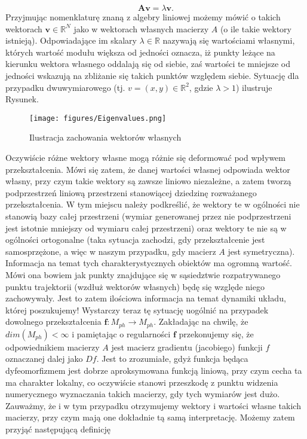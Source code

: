 \documentclass[12pt]{article}
\begin{document}
\begin{equation}
	\textbf{A}\textbf{v} = \lambda \textbf{v}.
\end{equation}
Przyjmując nomenklaturę znaną z algebry liniowej możemy mówić o takich wektorach $ \textbf{v} \in \mathbb{R}^{N} $ jako w wektorach własnych macierzy $ A $ (o ile takie wektory istnieją). Odpowiadające im skalary $ \lambda \in \mathbb{R} $ nazywają się wartościami własnymi, których wartość modułu większa od jedności oznacza, iż punkty leżące na kierunku wektora własnego oddalają się od siebie, zaś wartości te mniejsze od jedności wskazują na zbliżanie się takich punktów względem siebie. Sytuację dla przypadku dwuwymiarowego (tj. $ v = (x,y) \in \mathbb{R}^2 $, gdzie $ \lambda > 1 $) ilustruje Rysunek.
\begin{figure}[H]
	\texttt{[image: figures/Eigenvalues.png]} 
	\centering
	\caption{Ilustracja zachowania wektorów własnych}
\end{figure}
Oczywiście różne wektory własne mogą różnie się deformować pod wpływem przekształcenia. Mówi się zatem, że danej wartości własnej odpowiada wektor własny, przy czym takie wektory są zawsze liniowo niezależne, a zatem tworzą podprzestrzeń liniową przestrzeni stanowiącej dziedzinę rozważanego przekształcenia. W tym miejscu należy podkreślić, że wektory te w ogólności nie stanowią bazy całej przestrzeni (wymiar generowanej przez nie podprzestrzeni jest istotnie mniejszy od wymiaru całej przestrzeni) oraz wektory te nie są w   ogólności ortogonalne (taka sytuacja zachodzi, gdy przekształcenie jest samosprzężone, a więc w naszym przypadku, gdy macierz $ A $ jest symetryczna). \newline
Informacja na temat tych charakterystycznych obiektów ma ogromną wartość. Mówi ona bowiem jak punkty znajdujące się w sąsiedztwie rozpatrywanego punktu trajektorii (wzdłuż wektorów własnych) będę się względe niego zachowywały. Jest to zatem ilościowa informacja na temat dynamiki układu, której poszukujemy! Wystarczy teraz tę sytuację uogólnić na przypadek dowolnego przekształcenia $ \textbf{f}: M_{ph} \rightarrow M_{ph}$. Zakładając na chwilę, że $ dim(M_{ph}) < \infty $ i pamiętając o regularności $ \textbf{f} $ przekonujemy się, że odpowiednikiem macierzy $ A $ jest macierz gradientu (jacobiego) funkcji $ f $ oznaczanej dalej jako $ Df $. Jest to zrozumiałe, gdyż funkcja będąca dyfeomorfizmem jest dobrze aproksymowana funkcją liniową, przy czym cecha ta ma charakter lokalny, co oczywiście stanowi przeszkodę z punktu widzenia numerycznego wyznaczania takich macierzy, gdy tych wymiarów jest dużo. Zauważmy, że i w tym przypadku otrzymujemy wektory i wartości własne takich macierzy, przy czym mają one dokładnie tą samą interpretację. Możemy zatem przyjąć następującą definicję
\end{document}
